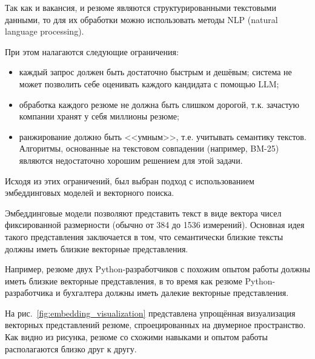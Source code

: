 \documentclass[14pt]{mmcs_article}
\begin{document}
Так как и вакансия, и резюме являются структурированными текстовыми данными, то для их обработки можно использовать методы NLP (natural language processing).

При этом налагаются следующие ограничения:

\begin{itemize}
  \item каждый запрос должен быть достаточно быстрым и дешёвым; система не может позволить себе оценивать каждого кандидата с помощью LLM;
  \item обработка каждого резюме не должна быть слишком дорогой, т.к. зачастую компании хранят у себя миллионы резюме;
  \item ранжирование должно быть <<умным>>, т.е. учитывать семантику текстов. Алгоритмы, основанные на текстовом совпадении (например, BM-25) являются недостаточно хорошим решением для этой задачи.
\end{itemize}

Исходя из этих ограничений, был выбран подход с использованием эмбеддинговых моделей и векторного поиска.

Эмбеддинговые модели позволяют представить текст в виде вектора чисел фиксированной размерности (обычно от 384 до 1536 измерений). Основная идея такого представления заключается в том, что семантически близкие тексты должны иметь близкие векторные представления.

Например, резюме двух Python-разработчиков с похожим опытом работы должны иметь близкие векторные представления, в то время как резюме Python-разработчика и бухгалтера должны иметь далекие векторные представления.

На рис.~\ref{fig:embedding_visualization} представлена упрощённая визуализация векторных представлений резюме, спроецированных на двумерное пространство. Как видно из рисунка, резюме со схожими навыками и опытом работы располагаются близко друг к другу.
\end{document}
